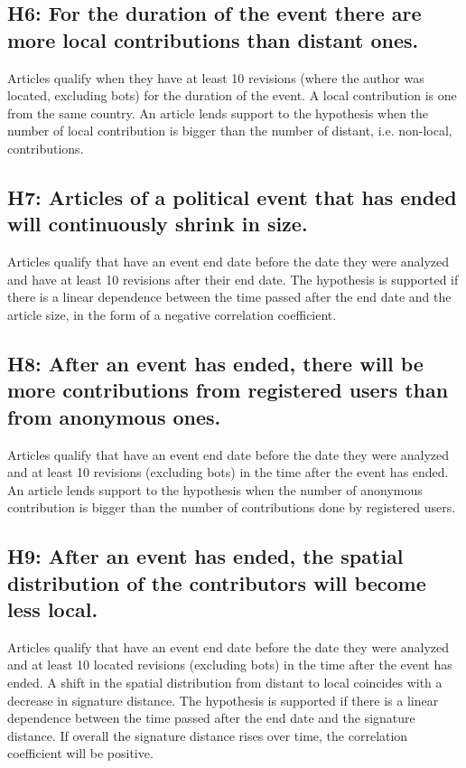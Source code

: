 \subsection*{H6: For the duration of the event there are more local contributions than distant ones.}

Articles qualify when they have at least 10 revisions (where the author was located, excluding bots) for the duration of the event.
A local contribution is one from the same country. 
An article lends support to the hypothesis when the number of local contribution is bigger than the number of distant, i.e. non-local, contributions.

\subsection*{H7: Articles of a political event that has ended will continuously shrink in size.}

Articles qualify that have an event end date before the date they were analyzed and have at least 10 revisions after their end date.
The hypothesis is supported if there is a linear dependence between the time passed after the end date and the article size, in the form of a negative correlation coefficient.

\subsection*{H8: After an event has ended, there will be more contributions from registered users than from anonymous ones.}

Articles qualify that have an event end date before the date they were analyzed and at least 10 revisions (excluding bots) in the time after the event has ended.
An article lends support to the hypothesis when the number of anonymous contribution is bigger than the number of contributions done by registered users.

\subsection*{H9: After an event has ended, the spatial distribution of the contributors will become less local.}

Articles qualify that have an event end date before the date they were analyzed and at least 10 located revisions (excluding bots) in the time after the event has ended.
A shift in the spatial distribution from distant to local coincides with a decrease in signature distance.
The hypothesis is supported if there is a linear dependence between the time passed after the end date and the signature distance.
If overall the signature distance rises over time, the correlation coefficient will be positive.

